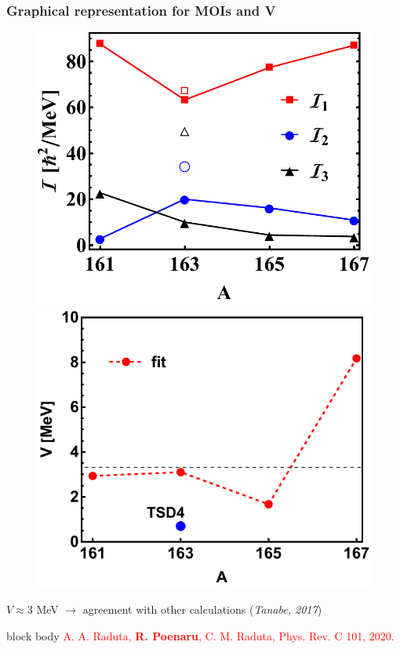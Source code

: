 \documentclass{beamer}
\begin{document}
\begin{frame}
	\frametitle{Graphical representation for MOIs and V}
	\vspace{-0.5cm}
	\begin{figure}
		\centering
		\includegraphics[scale=0.46]{figures/fig1_moivalues.pdf}
		\includegraphics[scale=0.61]{figures/V-param-fitting.pdf}
		\vspace{-0.2cm}
	\end{figure}
	$V\approx 3$ MeV $\rightarrow$ agreement with other calculations (\textit{Tanabe, 2017})
	\begin{beamercolorbox}[rounded=true,shadow=false, wd=\linewidth,]{block body}
		\centering
		\textcolor{red}{\footnotesize{A. A. Raduta, \textbf{R. Poenaru}, C. M. Raduta, Phys. Rev. C 101, 2020.}}
	\end{beamercolorbox}
\end{frame}
\end{document}

